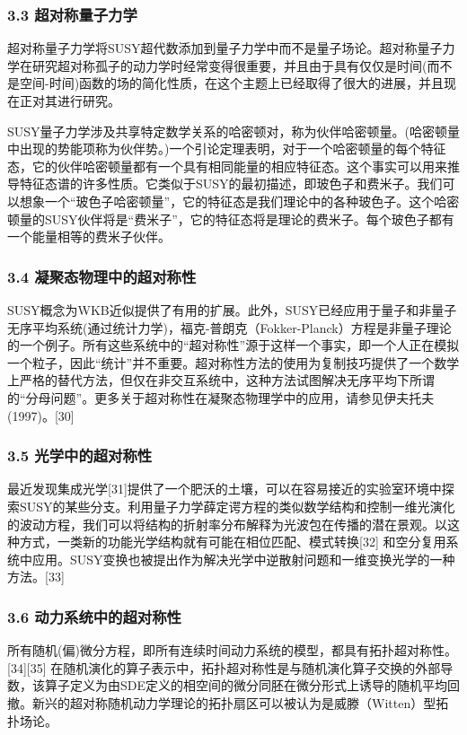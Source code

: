 \subsubsection{3.3 超对称量子力学}
超对称量子力学将SUSY超代数添加到量子力学中而不是量子场论。超对称量子力学在研究超对称孤子的动力学时经常变得很重要，并且由于具有仅仅是时间(而不是空间-时间)函数的场的简化性质，在这个主题上已经取得了很大的进展，并且现在正对其进行研究。

SUSY量子力学涉及共享特定数学关系的哈密顿对，称为伙伴哈密顿量。(哈密顿量中出现的势能项称为伙伴势。)一个引论定理表明，对于一个哈密顿量的每个特征态，它的伙伴哈密顿量都有一个具有相同能量的相应特征态。这个事实可以用来推导特征态谱的许多性质。它类似于SUSY的最初描述，即玻色子和费米子。我们可以想象一个“玻色子哈密顿量”，它的特征态是我们理论中的各种玻色子。这个哈密顿量的SUSY伙伴将是“费米子”，它的特征态将是理论的费米子。每个玻色子都有一个能量相等的费米子伙伴。
\subsubsection{3.4 凝聚态物理中的超对称性}
SUSY概念为WKB近似提供了有用的扩展。此外，SUSY已经应用于量子和非量子无序平均系统(通过统计力学)，福克-普朗克（Fokker-Planck）方程是非量子理论的一个例子。所有这些系统中的“超对称性”源于这样一个事实，即一个人正在模拟一个粒子，因此“统计”并不重要。超对称性方法的使用为复制技巧提供了一个数学上严格的替代方法，但仅在非交互系统中，这种方法试图解决无序平均下所谓的“分母问题”。更多关于超对称性在凝聚态物理学中的应用，请参见伊夫托夫(1997)。[30]
\subsubsection{3.5 光学中的超对称性}
最近发现集成光学[31]提供了一个肥沃的土壤，可以在容易接近的实验室环境中探索SUSY的某些分支。利用量子力学薛定谔方程的类似数学结构和控制一维光演化的波动方程，我们可以将结构的折射率分布解释为光波包在传播的潜在景观。以这种方式，一类新的功能光学结构就有可能在相位匹配、模式转换[32] 和空分复用系统中应用。SUSY变换也被提出作为解决光学中逆散射问题和一维变换光学的一种方法。[33]
\subsubsection{3.6 动力系统中的超对称性}
所有随机(偏)微分方程，即所有连续时间动力系统的模型，都具有拓扑超对称性。[34][35] 在随机演化的算子表示中，拓扑超对称性是与随机演化算子交换的外部导数，该算子定义为由SDE定义的相空间的微分同胚在微分形式上诱导的随机平均回撤。新兴的超对称随机动力学理论的拓扑扇区可以被认为是威滕（Witten）型拓扑场论。

